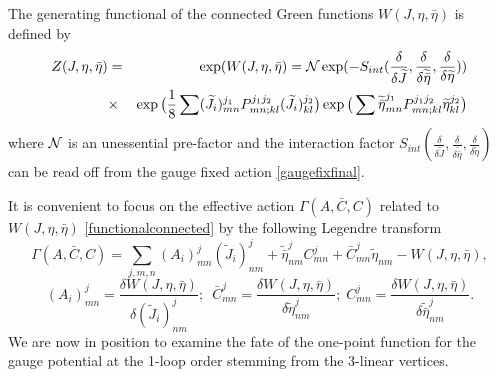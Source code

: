 \documentclass[a4paper,11pt]{article}
\numberwithin{equation}{section}
\theoremstyle{nonumberplain}
\begin{document}
The generating functional of the connected Green functions $W(J,\eta,\bar\eta)$ is defined by
\begin{eqnarray}
Z(J,\eta,\bar\eta)&=&\exp(W(J,\eta,\bar\eta)
={\cal{N}}\exp(-S_{int}(\frac{\delta}{\delta \widetilde J},\frac{\delta}{\delta\widetilde{\bar\eta}},\frac{\delta}{\delta\widetilde{\eta}}))\nonumber\\
&\times&\exp\big(\frac{1}{8}\sum(\widetilde J_i)^{j_1}_{mn}P^{j_1 j_2}_{mn;kl} (\widetilde J_i)^{j_2}_{kl}\big)\exp\big(\sum\widetilde{\bar\eta}^{j_1}_{mn}P^{j_1 j_2}_{mn;kl}\widetilde{\eta}^{j_2}_{kl}\big)\label{functionalconnected}
\end{eqnarray}
where ${\cal{N}}$ is an unessential pre-factor and the interaction factor $S_{int}(\frac{\delta}{\delta \widetilde J},\frac{\delta}{\delta\widetilde{\bar\eta}},\frac{\delta}{\delta\widetilde{\eta}})$ can be read off from the gauge fixed action \eqref{gaugefixfinal}. 

It is convenient to focus on the effective action $\Gamma(A, \bar C, C)$ related to $W(J,\eta,\bar\eta)$ \eqref{functionalconnected} by the following Legendre transform 
\begin{equation}
\Gamma(A, \bar C, C)=\sum_{j,m,n} (A_i)^j_{mn}(\widetilde J_i)^j_{nm}+\widetilde{\bar\eta}^j_{nm}C^j_{mn}+\bar C^j_{mn}\widetilde{\eta}_{nm}-W(J,\eta,\bar\eta)\label{legendre1},
\end{equation}
\begin{equation}
(A_i)^j_{mn}=\frac{\delta W(J,\eta,\bar\eta)}{\delta(\widetilde J_i)^j_{nm}};\;\ \bar C^j_{mn}=\frac{\delta W(J,\eta,\bar\eta)}{\delta\widetilde\eta^j_{nm}};\; C^j_{mn}=\frac{\delta W(J,\eta,\bar\eta)}{\delta\widetilde{\bar\eta}^j_{nm}}\label{legendre2}.
\end{equation}
We are now in position to examine the fate of the one-point function for the gauge potential at the 1-loop order stemming from the 3-linear vertices. \par 
\end{document}
